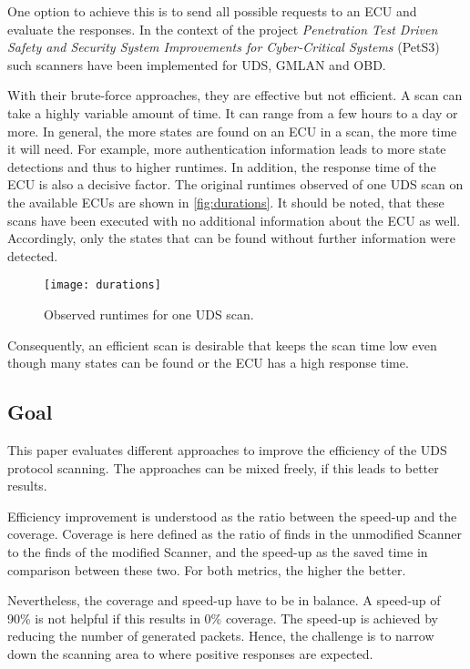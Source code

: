 One option to achieve this is to send all possible requests to an ECU and evaluate the responses. In the context of the project \emph{Penetration Test Driven Safety and Security System Improvements for Cyber-Critical Systems} (PetS3) \cite{pets3} such scanners have been implemented for UDS, GMLAN and OBD.

With their brute-force approaches, they are effective but not efficient. A scan can take a highly variable amount of time. It can range from a few hours to a day or more. In general, the more states are found on an ECU in a scan, the more time it will need. For example, more authentication information leads to more state detections and thus to higher runtimes. In addition, the response time of the ECU is also a decisive factor. The original runtimes observed of one UDS scan on the available ECUs are shown in \autoref{fig:durations}. It should be noted, that these scans have been executed with no additional information about the ECU as well. Accordingly, only the states that can be found without further information were detected.

\begin{figure}[h]
    \centering
    \texttt{[image: durations]}
    \caption{Observed runtimes for one UDS scan.}
    \label{fig:durations}
\end{figure}

Consequently, an efficient scan is desirable that keeps the scan time low even though many states can be found or the ECU has a high response time.

\subsection{Goal}

This paper evaluates different approaches to improve the efficiency of the UDS protocol scanning. The approaches can be mixed freely, if this leads to better results.

Efficiency improvement is understood as the ratio between the speed-up and the coverage. Coverage is here defined as the ratio of finds in the unmodified Scanner to the finds of the modified Scanner, and the speed-up as the saved time in comparison between these two. For both metrics, the higher the better.

Nevertheless, the coverage and speed-up have to be in balance. A speed-up of 90\% is not helpful if this results in 0\% coverage. The speed-up is achieved by reducing the number of generated packets. Hence, the challenge is to narrow down the scanning area to where positive responses are expected.


